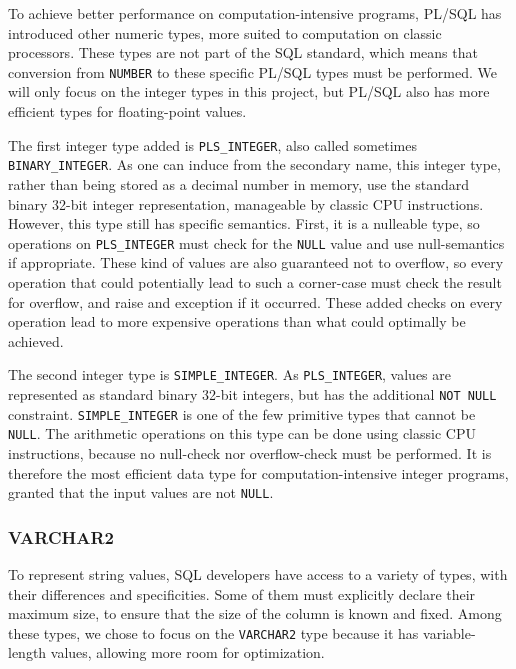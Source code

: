 \documentclass[twoside,11pt,a4paper]{article}
\newcommand{\pls}[1]{\small\texttt{#1}\normalsize}
\newcommand{\plstype}[1]{\pls{#1}}
\newcommand{\varchar}{\plstype{VARCHAR2}}
\newcommand{\oranum}{\plstype{NUMBER}}
\newcommand{\plsi}{\plstype{PLS\_INTEGER}}
\newcommand{\simpleint}{\plstype{SIMPLE\_INTEGER}}
\newcommand{\plsnull}{\pls{NULL}}
\begin{document}
 
To achieve better performance on computation-intensive programs, PL/SQL has introduced other numeric types, more suited to computation on classic processors. These types are not part of the SQL standard, which means that conversion from \oranum{} to these specific PL/SQL types must be performed. We will only focus on the integer types in this project, but PL/SQL also has more efficient types for floating-point values.

The first integer type added is \plsi{}, also called sometimes \plstype{BINARY\_INTEGER}. As one can induce from the secondary name, this integer type, rather than being stored as a decimal number in memory, use the standard binary 32-bit integer representation, manageable by classic CPU instructions. However, this type still has specific semantics. First, it is a nulleable type, so operations on \plsi{} must check for the \plsnull{} value and use null-semantics if appropriate. These kind of values are also guaranteed not to overflow, so every operation that could potentially lead to such a corner-case must check the result for overflow, and raise and exception if it occurred. These added checks on every operation lead to more expensive operations than what could optimally be achieved.

The second integer type is \simpleint{}. As \plsi{}, values are represented as standard binary 32-bit integers, but has the additional \pls{NOT NULL} constraint. \simpleint{} is one of the few primitive types that cannot be \plsnull{}. The arithmetic operations on this type can be done using classic CPU instructions, because no null-check nor overflow-check must be performed. It is therefore the most efficient data type for computation-intensive integer programs, granted that the input values are not \plsnull{}.

\subsubsection{VARCHAR2}

To represent string values, SQL developers have access to a variety of types, with their differences and specificities. Some of them must explicitly declare their maximum size, to ensure that the size of the column is known and fixed. Among these types, we chose to focus on the \varchar{} type because it has variable-length values, allowing more room for optimization.
\end{document}
